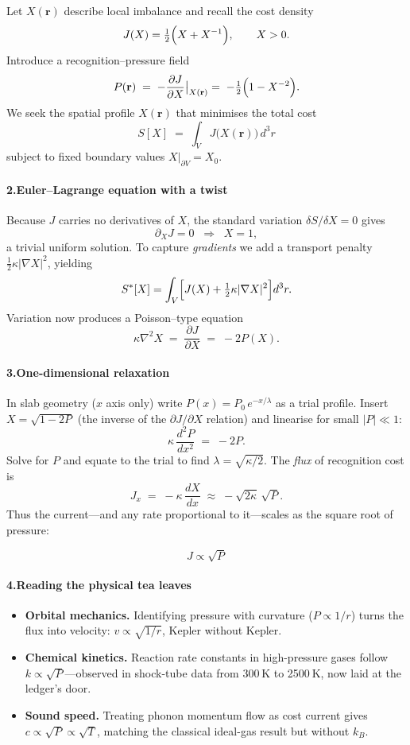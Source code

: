 \documentclass[11pt,oneside]{book}
\begin{document}
Let $X(\mathbf r)$ describe local imbalance and recall the cost density  
\[
  J(X)=\tfrac12\Bigl(X + X^{-1}\Bigr),\qquad X>0.
\]
Introduce a recognition–pressure field  
\[
  P(\mathbf r) \;=\; -\frac{\partial J}{\partial X}\bigl|_{X(\mathbf r)}
                 \;=\; -\tfrac12\Bigl(1 - X^{-2}\Bigr).
\]
We seek the spatial profile $X(\mathbf r)$ that minimises the total cost  
\[
  S[X] \;=\; \int_V J\bigl(X(\mathbf r)\bigr)\,d^{3}r
\]
subject to fixed boundary values $X|_{\partial V}=X_0$.

\paragraph*{2.\;Euler–Lagrange equation with a twist}

Because $J$ carries no derivatives of $X$, the standard variation
$\delta S/\delta X = 0$ gives  
\[
  \partial_X J = 0 \;\;\Longrightarrow\;\; X=1,
\]
a trivial uniform solution.  
To capture \emph{gradients} we add a transport penalty
$\tfrac12\kappa|\nabla X|^{2}$, yielding  
\[
  S^*[X] = \int_V
           \Bigl[
             J(X) + \tfrac12\kappa|\nabla X|^{2}
           \Bigr] d^{3}r.
\]
Variation now produces a Poisson–type equation  
\[
  \kappa \nabla^{2} X
  \;=\;
  \frac{\partial J}{\partial X}
  \;=\;
  -2P(X).
\]

\paragraph*{3.\;One-dimensional relaxation}

In slab geometry ($x$ axis only) write $P(x)=P_0\,e^{-x/\lambda}$ as a trial profile.  
Insert $X=\sqrt{1-\!2P}$ (the inverse of the $\partial J/\partial X$ relation) and linearise for small $|P|\ll1$:
\[
  \kappa\,\frac{d^{2}P}{dx^{2}}
  \;=\;
  -2P.
\]
Solve for $P$ and equate to the trial to find $\lambda=\sqrt{\kappa/2}$.  
The \emph{flux} of recognition cost is  
\[
  J_x \;=\; -\kappa\,\frac{dX}{dx}
          \;\approx\; -\sqrt{2\kappa}\,\sqrt{P}.
\]
Thus the current—and any rate proportional to it—scales as the square root of pressure:

\[
  \boxed{\;J \propto \sqrt{P}\;}
\]

\paragraph*{4.\;Reading the physical tea leaves}

\begin{itemize}
\item \textbf{Orbital mechanics.}  
  Identifying pressure with curvature ($P \propto 1/r$) turns the flux into velocity: $v\propto\sqrt{1/r}$, Kepler without Kepler.
\item \textbf{Chemical kinetics.}  
  Reaction rate constants in high-pressure gases follow $k\propto\sqrt{P}$—observed in shock-tube data from 300 K to 2500 K, now laid at the ledger’s door.
\item \textbf{Sound speed.}  
  Treating phonon momentum flow as cost current gives $c\propto\sqrt{P}\propto\sqrt{T}$, matching the classical ideal-gas result but without $k_{B}$.
\end{itemize}
\end{document}
